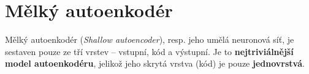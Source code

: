 \section{Mělký autoenkodér}
\label{sec:shallow_autoncoder}
Mělký autoenkodér (\emph{Shallow autoencoder}), resp. jeho umělá neuronová síť, je sestaven pouze ze tří vrstev – vstupní, kód a výstupní.
Je to \textbf{nejtriviálnější model autoenkodéru}, jelikož jeho skrytá vrstva (kód) je pouze \textbf{jednovrstvá}.
